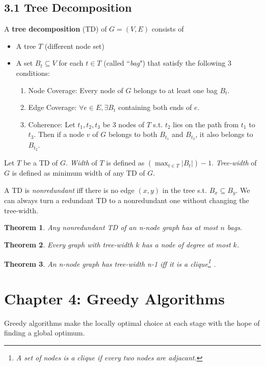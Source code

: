 \documentclass{report}
\newtheorem{Theorem}{Theorem}
\begin{document}
\subsection*{3.1 Tree Decomposition}
A \textbf{tree decomposition} (TD) of $G=(V,E)$ consists of 
\begin{itemize}
	\item A tree $T$ (different node set)
	\item A set $B_t\subseteq V$ for each $t\in T$ (called ``\emph{bag}") that satisfy the following 3 conditions:
	\begin{enumerate}
		\item Node Coverage: Every node of $G$ belongs to at least one bag $B_t$.
		\item Edge Coverage: $\forall e\in E, \exists B_t$ containing both ends of $e$.
		\item Coherence: Let $t_1, t_2, t_3$ be 3 nodes of $T$ s.t. $t_2$ lies on the path from $t_1$ to $t_3$. Then if a node $v$ of $G$ belongs to both $B_{t_1}$ and $B_{t_3}$, it also belongs to $B_{t_2}$.
	\end{enumerate}
\end{itemize}
Let $T$ be a TD of $G$. \emph{Width} of $T$ is defined as $(\max_{t\in T} |B_t|) -1$. \emph{Tree-width} of $G$ is defined as minimum width of any TD of $G$.

A TD is \emph{nonredundant} iff there is no edge $(x,y)$ in the tree s.t. $B_x\subseteq B_y$. We can always turn a redundant TD to a nonredundant one without changing the tree-width.
\begin{Theorem}
	Any nonredundant TD of an n-node graph has at most $n$ bags.
\end{Theorem}
\begin{Theorem}
	Every graph with tree-width $k$ has a node of degree at most $k$.
\end{Theorem}
\begin{Theorem}
	An n-node graph has tree-width n-1 iff it is a clique\footnote{A set of nodes is a \emph{clique} if every two nodes are adjacant.} .
\end{Theorem}

\section*{Chapter 4: Greedy Algorithms}
Greedy algorithms make the locally optimal choice at each stage with the hope of finding a global optimum.\\
\end{document}
